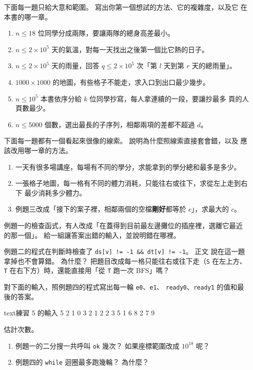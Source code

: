 \begin{drills}[label=drills:cap]
\item 下面每一題只給大意和範圍。 寫出你第一個想試的方法、它的複雜度，以及它
在本書的哪一章。
\begin{enumerate}
\item $n \le 18$ 位同學分成兩隊，要讓兩隊的總身高差最小。
\item $n \le 2 \times 10^5$ 天的氣溫，對每一天找出之後第一個比它熱的日子。
\item $n \le 2 \times 10^5$ 天的雨量，回答 $q \le 2 \times 10^5$ 次「第 $l$
天到第 $r$ 天的總雨量」。
\item $1000 \times 1000$ 的地圖，有些格子不能走，求入口到出口最少幾步。
\item $n \le 10^5$ 本書依序分給 $k$ 位同學抄寫，每人拿連續的一段，要讓抄最多
頁的人頁數最少。
\item $n \le 5000$ 個數，選出最長的子序列，相鄰兩項的差都不超過 $d$。
\end{enumerate}

\item 下面每一題都有一個看起來很像的線索。 說明為什麼照線索直接套會錯，以及
應該改用哪一章的方法。
\begin{enumerate}
\item 一天有很多場講座，每場有不同的學分，求能拿到的學分總和最多是多少。
\item 一張格子地圖，每一格有不同的體力消耗，只能往右或往下，求從左上走到右下
最少消耗多少體力。
\item 例題三改成「接下的案子裡，相鄰兩個的空檔\textbf{剛好}都等於 $c$」，求最大的 $c$。
\end{enumerate}

\item 例題一的檢查函式，有人改成「在蓋得到目前最左邊攤位的插座裡，選離它最近
的那一個」。 給一組讓答案出錯的輸入，並說明錯在哪裡。

\item 例題二的程式在判斷時檢查了 \texttt{ds[v] != -1 \&\& dt[v] != -1}。 正文
說在這一題拿掉也不會算錯。 為什麼？ 把題目改成每一格只能往右或往下走（\texttt{S}
在左上方、\texttt{T} 在右下方）時，還能直接用「從 \texttt{T} 跑一次 BFS」嗎？

\item 對下面的輸入，照例題四的程式寫出每一輪 \texttt{e0}、\texttt{e1}、
\texttt{ready0}、\texttt{ready1} 的值和最後的答案。
\begin{code}{text}{練習 5 的輸入}
5 2
1 0 3
2 1 2
2 3 5
1 6 8
2 7 9
\end{code}

\item 估計次數。
\begin{enumerate}
\item 例題一的二分搜一共呼叫 \texttt{ok} 幾次？ 如果座標範圍改成 $10^{18}$
呢？
\item 例題四的 \texttt{while} 迴圈最多跑幾輪？ 為什麼？
\end{enumerate}
\end{drills}

